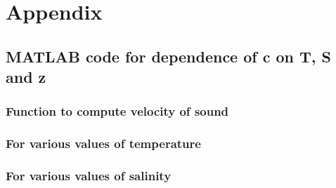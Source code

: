 
\chapter*{Appendix} \label{Appendix}

\section{ MATLAB code for dependence of c on T, S and z } \label{MATLAB code for dependence of c on T, S and z }


\subsection{Function to compute velocity of sound} \label{Function to compute velocity of sound} 



\subsection{For various values of temperature} \label{For various values of temperature} 


\subsection{For various values of salinity} \label{For various values of salinity} 



%